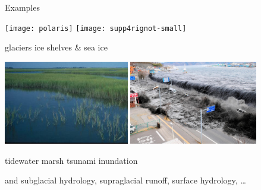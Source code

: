 \documentclass{beamer}
\begin{document}
\begin{frame}{Examples}

\texttt{[image: polaris]}
\hfill
\texttt{[image: supp4rignot-small]}

\small glaciers \hfill ice shelves \& sea ice

\medskip
\includegraphics[width=0.41\textwidth,keepaspectratio=true]{marsh-water}
\hfill
\includegraphics[width=0.42\textwidth,keepaspectratio=true]{tsunami-sendai}

\small tidewater marsh \hfill tsunami inundation

\scriptsize and subglacial hydrology, supraglacial runoff, surface hydrology, \dots
\end{frame}
\end{document}
